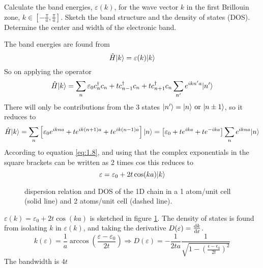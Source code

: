 \begin{exercise}
Calculate the band energies, $\varepsilon(k)$, for the wave vector $k$ in the first Brillouin zone, $k \in [-\frac{\pi}{a},\frac{\pi}{a}]$. Sketch the band structure and the density of states (DOS). Determine the center and width of the electronic band.
\end{exercise}
\begin{solution}
The band energies are found from
\begin{equation}
    \hat{H}|k\rangle = \varepsilon(k)|k\rangle
\end{equation}
So on applying the operator
\begin{equation}
    \hat{H}|k\rangle = \sum_n \varepsilon_0 c_n^{\dagger} c_n + t c_{n-1}^{\dagger} c_n + t c_{n+1}^{\dagger}c_n \sum_{n'} e^{ikn'a} |n'\rangle
\end{equation}
There will only be contributions from the 3 states $|n'\rangle = |n\rangle \text{ or } |n \pm 1\rangle$, so it reduces to
\begin{equation}
    \hat{H}|k\rangle = \sum_n \left[ \varepsilon_0 e^{ikna} + t e^{ik(n+1)a} + t e^{ik(n-1)a} \right] |n\rangle =  \left[ \varepsilon_0 + t e^{ika} + t e^{-ika} \right] \sum_n e^{ikna} |n\rangle
\end{equation}
According to equation \ref{eq:1.8}, and using that the complex exponentials in the square brackets can be written as 2 times cos this reduces to
\begin{equation}
   \varepsilon = \varepsilon_0 + 2 t \cos(ka) |k\rangle
   \label{eq:114}
\end{equation}

\begin{figure}
    \centering
    
    \caption{dispersion relation and DOS of the 1D chain in a 1 atom/unit cell (solid line) and 2 atoms/unit cell (dashed line).}
    \label{fig:1D_dispersion}
\end{figure}
    $\varepsilon(k) = \varepsilon_0 + 2 t \cos(ka)$ is sketched in figure \ref{fig:1D_dispersion}. 
    The density of states is found from isolating $k$ in $\varepsilon(k)$, and taking the derivative $D(\varepsilon) = \dv{k}{\varepsilon}$.
    \begin{equation}
        k(\varepsilon) = \frac{1}{a} \arccos\left(\frac{\varepsilon -\varepsilon_0}{2t} \right) \Rightarrow D(\varepsilon) = -\frac{1}{2ta} \frac{1}{\sqrt{1-\left(\frac{\epsilon-\epsilon_0}{2t} \right)^2}}
    \end{equation}
    The bandwidth is $4t$
\end{solution}

